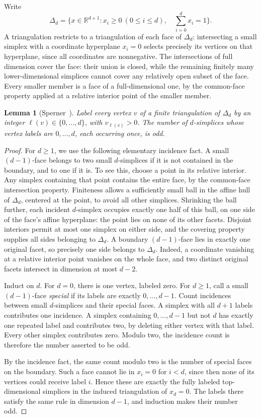 \documentclass[11pt]{amsart}
\newtheorem{lemma}[theorem]{Lemma}
\theoremstyle{definition}
\theoremstyle{remark}
\numberwithin{equation}{section}
\begin{document}
Write
\[
 \Delta_d=\{x\in\mathbb R^{d+1}:x_i\ge0\ (0\le i\le d),\quad
                                  \sum_{i=0}^d x_i=1\}.
\]
A triangulation restricts to a triangulation of each face of
\(\Delta_d\): intersecting a small simplex with a coordinate
hyperplane \(x_i=0\) selects precisely its vertices on that
hyperplane, since all coordinates are nonnegative. The intersections
of full dimension cover the face: their union is closed, while the
remaining finitely many lower-dimensional simplices cannot cover
any relatively open subset of the face. Every smaller member is a
face of a full-dimensional one, by the common-face property applied
at a relative interior point of the smaller member.

\begin{lemma}[Sperner~\cite{Sperner1928}]\label{lemma:sperner}
Label every vertex \(v\) of a finite triangulation of \(\Delta_d\)
by an integer \(\ell(v)\in\{0,\ldots,d\}\), with
\(v_{\ell(v)}>0\). The number of \(d\)-simplices whose vertex
labels are \(0,\ldots,d\), each occurring once, is odd.
\end{lemma}
\begin{proof}
For \(d\ge1\), we use the following elementary incidence fact.
A small \((d-1)\)-face belongs to two small \(d\)-simplices if
it is not contained in the boundary, and to one if it is.
To see this, choose a point in its relative interior. Any simplex containing that point
contains the entire face, by the common-face intersection property.
Finiteness allows a sufficiently small ball in the affine hull of
\(\Delta_d\), centered at the point, to avoid all other simplices.
Shrinking the ball further, each incident \(d\)-simplex occupies
exactly one half of this ball, on one side of the face's affine
hyperplane: the point lies on none of its other facets. Disjoint
interiors permit at most one simplex on either side, and the covering
property supplies all sides belonging to \(\Delta_d\). A boundary
\((d-1)\)-face lies in exactly one original facet, so precisely one
side belongs to \(\Delta_d\). Indeed, a coordinate vanishing at a
relative interior point vanishes on the whole face, and two distinct
original facets intersect in dimension at most \(d-2\).

Induct on \(d\). For \(d=0\), there is one vertex, labeled zero.
For \(d\ge1\), call a small \((d-1)\)-face \emph{special} if
its labels are exactly \(0,\ldots,d-1\). Count incidences between
small \(d\)-simplices and their special faces. A simplex with all
\(d+1\) labels contributes one incidence. A simplex containing
\(0,\ldots,d-1\) but not \(d\) has exactly one repeated label
and contributes two, by deleting either vertex with that label.
Every other simplex contributes zero. Modulo two, the incidence
count is therefore the number asserted to be odd.

By the incidence fact, the same count modulo two is the number of
special faces on the boundary. Such a face cannot lie in
\(x_i=0\) for \(i<d\), since then none of its vertices could
receive label \(i\). Hence these are exactly the fully labeled
top-dimensional simplices in the induced triangulation of
\(x_d=0\). The labels there satisfy the same rule in dimension
\(d-1\), and induction makes their number odd.
\end{proof}
\end{document}
